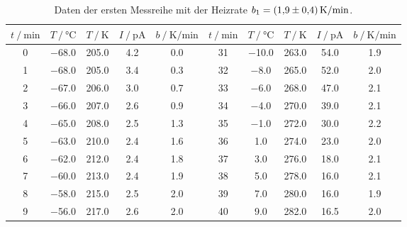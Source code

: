\begin{table}
    \centering
    \caption{Daten der ersten Messreihe mit der Heizrate $b_1 = \qty{1.9+-0.4}{\kelvin\per\minute}$.}
    \label{tab:measurements_1}
    \begin{tabular}{S S S S S | S S S S S}
      \toprule
      {$t \mathbin{/} \unit{\minute}$} & {$T \mathbin{/} \unit{\celsius}$} & {$T \mathbin{/} \unit{\kelvin}$} &%
      {$I \mathbin{/} \unit{\pico\ampere}$} & {$b \mathbin{/} \unit{\kelvin\per\minute}$} & {$t \mathbin{/} \unit{\minute}$} &%
      {$T \mathbin{/} \unit{\celsius}$} & {$T \mathbin{/} \unit{\kelvin}$} & {$I \mathbin{/} \unit{\pico\ampere}$} &%
      {$b \mathbin{/} \unit{\kelvin\per\minute}$}\\
      \midrule
        \num{ 0} &  \num{-68.0} &  \num{205.0} &  \num{ 4.2} &  \num{0.0} & \num{31} &  \num{-10.0} &  \num{263.0} &  \num{54.0} &  \num{1.9} \\
        \num{ 1} &  \num{-68.0} &  \num{205.0} &  \num{ 3.4} &  \num{0.3} & \num{32} &  \num{ -8.0} &  \num{265.0} &  \num{52.0} &  \num{2.0} \\
        \num{ 2} &  \num{-67.0} &  \num{206.0} &  \num{ 3.0} &  \num{0.7} & \num{33} &  \num{ -6.0} &  \num{268.0} &  \num{47.0} &  \num{2.1} \\
        \num{ 3} &  \num{-66.0} &  \num{207.0} &  \num{ 2.6} &  \num{0.9} & \num{34} &  \num{ -4.0} &  \num{270.0} &  \num{39.0} &  \num{2.1} \\
        \num{ 4} &  \num{-65.0} &  \num{208.0} &  \num{ 2.5} &  \num{1.3} & \num{35} &  \num{ -1.0} &  \num{272.0} &  \num{30.0} &  \num{2.2} \\
        \num{ 5} &  \num{-63.0} &  \num{210.0} &  \num{ 2.4} &  \num{1.6} & \num{36} &  \num{  1.0} &  \num{274.0} &  \num{23.0} &  \num{2.0} \\
        \num{ 6} &  \num{-62.0} &  \num{212.0} &  \num{ 2.4} &  \num{1.8} & \num{37} &  \num{  3.0} &  \num{276.0} &  \num{18.0} &  \num{2.1} \\
        \num{ 7} &  \num{-60.0} &  \num{213.0} &  \num{ 2.4} &  \num{1.9} & \num{38} &  \num{  5.0} &  \num{278.0} &  \num{16.0} &  \num{2.1} \\
        \num{ 8} &  \num{-58.0} &  \num{215.0} &  \num{ 2.5} &  \num{2.0} & \num{39} &  \num{  7.0} &  \num{280.0} &  \num{16.0} &  \num{1.9} \\
        \num{ 9} &  \num{-56.0} &  \num{217.0} &  \num{ 2.6} &  \num{2.0} & \num{40} &  \num{  9.0} &  \num{282.0} &  \num{16.5} &  \num{2.0} \\

\end{tabular}
\end{table}
